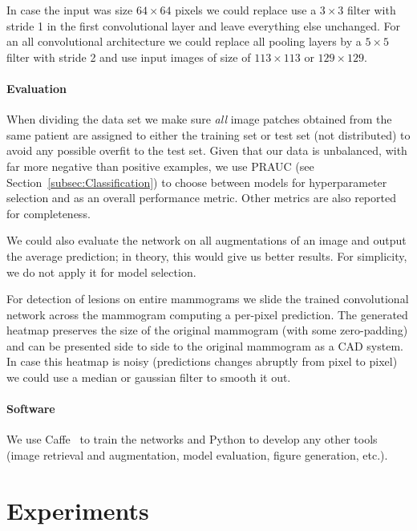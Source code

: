 \documentclass[11pt]{article}
\begin{document}
	In case the input was size $64 \times 64$ pixels we could replace use a $3 \times 3$ filter with stride 1 in the first convolutional layer and leave everything else unchanged. For an all convolutional architecture we could replace all pooling layers by a $5 \times 5$ filter  with stride 2 and use input images of size of $113 \times 113$ or $129 \times 129$.

	\subsection{Evaluation}
	When dividing the data set we make sure \textit{all} image patches obtained from the same patient are assigned to either the training set or test set (not distributed) to avoid any possible overfit to the test set. Given that our data is unbalanced, with far more negative than positive examples, we use PRAUC (see Section~\ref{subsec:Classification}) to choose between models for hyperparameter selection and as an overall performance metric. Other metrics are also reported for completeness. 

	We could also evaluate the network on all augmentations of an image and output the average prediction; in theory, this would give us better results. For simplicity, we do not apply it for model selection.

	For detection of lesions on entire mammograms we slide the trained convolutional network across the mammogram computing a per-pixel prediction. The generated heatmap preserves the size of the original mammogram (with some zero-padding) and can be presented side to side to the original mammogram as a CAD system. In case this heatmap is noisy (predictions changes abruptly from pixel to pixel) we could use a median or gaussian filter to smooth it out.%

	\subsection{Software}
	We use Caffe~\cite{Jia2014} to train the networks and Python to develop any other tools (image retrieval and augmentation, model evaluation, figure generation, etc.).





	\part{Experiments}
\end{document}
